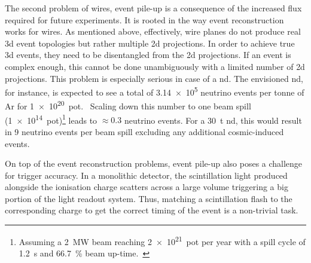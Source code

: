 The second problem of wires, event pile-up is a consequence of the increased flux required for future experiments.
It is rooted in the way event reconstruction works for wires.
As mentioned above, effectively, wire planes do not produce real \gls{3d} event topologies but rather multiple \gls{2d} projections.
In order to achieve true \gls{3d} events, they need to be disentangled from the \gls{2d} projections.
If an event is complex enough, this cannot be done unambiguously with a limited number of \gls{2d} projections.
This problem is especially serious in case of a \gls{nd}.
The envisioned \dune{} \gls{nd}, for instance, is expected to see a total of \num{3.14e5} neutrino events per tonne of Ar for \num{1e20}~\gls{pot}.~\cite{dune2}
Scaling down this number to one beam spill (\num{1e14}~\gls{pot})\footnote{Assuming a \SI{2}{\mega\watt} beam reaching \num{2e21}~\gls{pot} per year with a spill cycle of \SI{1.2}{\second} and \SI{66.7}{\percent} beam up-time.~\cite{dune2, dune4}} leads to $\approx \num{0.3}$ neutrino events.
For a \SI{30}{\tonne} \gls{nd}, this would result in \num{9} neutrino events per beam spill excluding any additional cosmic-induced events.

On top of the event reconstruction problems, event pile-up also poses a challenge for trigger accuracy.
In a monolithic detector, the scintillation light produced alongside the ionisation charge scatters across a large volume triggering a big portion of the light readout system.
Thus, matching a scintillation flash to the corresponding charge to get the correct timing of the event is a non-trivial task.